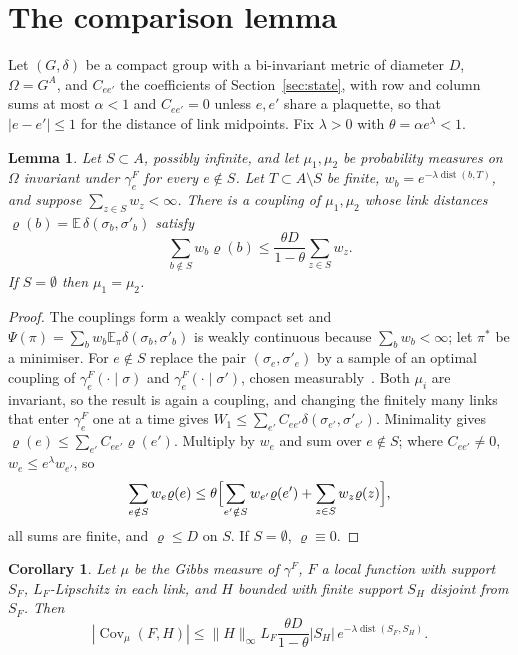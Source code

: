 \documentclass[11pt]{amsart}
\newtheorem{lemma}[theorem]{Lemma}
\newtheorem{corollary}[theorem]{Corollary}
\theoremstyle{definition}
\theoremstyle{remark}
\numberwithin{equation}{section}
\newcommand{\E}{\mathbb{E}}
\newcommand{\Cov}{\operatorname{Cov}}
\newcommand{\dist}{\operatorname{dist}}
\begin{document}
\section{The comparison lemma}\label{app:comparison}

Let $(G,\delta)$ be a compact group with a bi-invariant metric of diameter
$D$, $\Omega=G^A$, and $C_{ee'}$ the coefficients of Section~\ref{sec:state},
with row and column sums at most $\alpha<1$ and $C_{ee'}=0$ unless $e,e'$ share
a plaquette, so that $|e-e'|\le1$ for the distance of link midpoints. Fix
$\lambda>0$ with $\theta=\alpha e^\lambda<1$.

\begin{lemma}\label{lem:comparison}
Let $S\subset A$, possibly infinite, and let $\mu_1,\mu_2$ be probability
measures on $\Omega$ invariant under $\gamma^F_e$ for every $e\notin S$. Let
$T\subset A\setminus S$ be finite, $w_b=e^{-\lambda\dist(b,T)}$, and suppose
$\sum_{z\in S}w_z<\infty$. There is a coupling of $\mu_1,\mu_2$ whose link
distances $\varrho(b)=\E\,\delta(\sigma_b,\sigma'_b)$ satisfy
\[
\sum_{b\notin S}w_b\varrho(b)\le\frac{\theta D}{1-\theta}\sum_{z\in S}w_z .
\]
If $S=\emptyset$ then $\mu_1=\mu_2$.
\end{lemma}

\begin{proof}
The couplings form a weakly compact set and $\Psi(\pi)=\sum_bw_b\E_\pi\delta(
\sigma_b,\sigma'_b)$ is weakly continuous because $\sum_bw_b<\infty$; let $\pi^*$ be
a minimiser. For $e\notin S$ replace the pair $(\sigma_e,\sigma'_e)$ by a sample of
an optimal coupling of $\gamma^F_e(\cdot\mid\sigma)$ and $\gamma^F_e(\cdot\mid
\sigma')$, chosen measurably~\cite[Cor.~5.22]{Vil09}. Both $\mu_i$ are
invariant, so the result is again a coupling, and changing the finitely
many links that enter $\gamma^F_e$ one at a time gives $W_1\le\sum_{e'}C_{ee'}
\delta(\sigma_{e'},\sigma'_{e'})$. Minimality gives $\varrho(e)\le\sum_{e'}C_{ee'}
\varrho(e')$. Multiply by $w_e$ and sum over $e\notin S$; where $C_{ee'}\ne0$,
$w_e\le e^\lambda w_{e'}$, so
\[
\sum_{e\notin S}w_e\varrho(e)\le\theta\Bigl[\sum_{e'\notin S}w_{e'}\varrho(e')
+\sum_{z\in S}w_z\varrho(z)\Bigr],
\]
all sums are finite, and $\varrho\le D$ on $S$. If $S=\emptyset$, $\varrho\equiv0$.
\end{proof}

\begin{corollary}\label{cor:decay}
Let $\mu$ be the Gibbs measure of $\gamma^F$, $F$ a local function with
support $S_F$, $L_F$-Lipschitz in each link, and $H$ bounded with finite
support $S_H$ disjoint from $S_F$. Then
\[
|\Cov_\mu(F,H)|\le\|H\|_\infty L_F\frac{\theta D}{1-\theta}|S_H|\,
e^{-\lambda\dist(S_F,S_H)}.
\]
\end{corollary}
\end{document}

